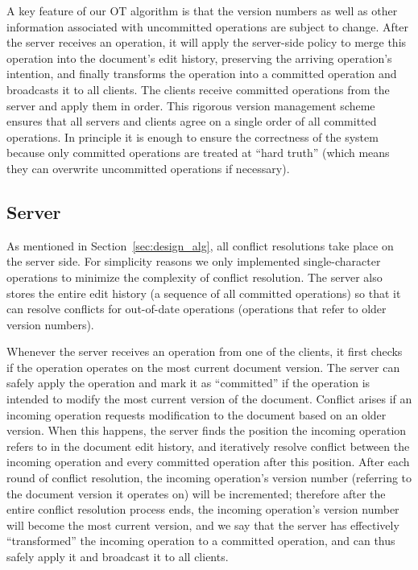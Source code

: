 A key feature of our OT algorithm is that the version numbers as well as other
information associated with uncommitted operations are subject to change. After
the server receives an operation, it will apply the server-side policy to merge
this operation into the document's edit history, preserving the arriving
operation's intention, and finally transforms the operation into a committed
operation and broadcasts it to all clients. The clients receive committed
operations from the server and apply them in order. This rigorous version
management scheme ensures that all servers and clients agree on a single order
of all committed operations. In principle it is enough to ensure the correctness
of the system because only committed operations are treated at ``hard truth''
(which means they can overwrite uncommitted operations if necessary).

\subsection{Server}
\label{sec:design_server}

As mentioned in Section~\ref{sec:design_alg}, all conflict resolutions take place
on the server side. For simplicity reasons we only implemented single-character
operations to minimize the complexity of conflict resolution. The server also
stores the entire edit history (a sequence of all committed operations) so that
it can resolve conflicts for out-of-date operations (operations that refer to
older version numbers).

Whenever the server receives an operation from one of the clients, it first
checks if the operation operates on the most current document version. The
server can safely apply the operation and mark it as ``committed'' if the
operation is intended to modify the most current version of the document.
Conflict arises if an incoming operation requests modification to the document
based on an older version. When this happens, the server finds the position the
incoming operation refers to in the document edit history, and iteratively
resolve conflict between the incoming operation and every committed operation
after this position. After each round of conflict resolution, the incoming
operation's version number (referring to the document version it operates on)
will be incremented; therefore after the entire conflict resolution process
ends, the incoming operation's version number will become the most current
version, and we say that the server has effectively ``transformed'' the incoming
operation to a committed operation, and can thus safely apply it and broadcast
it to all clients.

